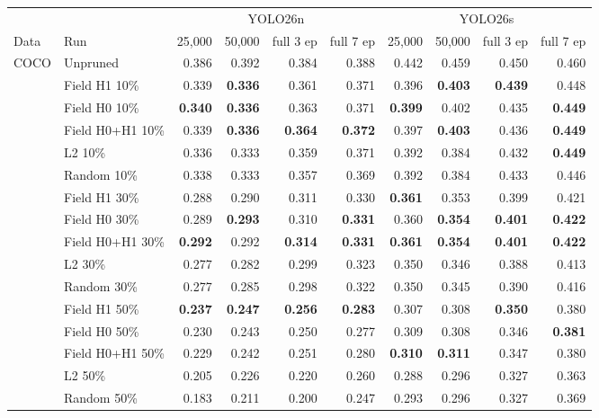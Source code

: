 \begin{tabular}{llrrrrrrrr}
\toprule
 & & \multicolumn{4}{c}{YOLO26n} & \multicolumn{4}{c}{YOLO26s} \\
\cmidrule(lr){3-6}\cmidrule(lr){7-10}
Data & Run & 25,000 & 50,000 & full 3 ep & full 7 ep & 25,000 & 50,000 & full 3 ep & full 7 ep \\
\midrule
COCO & Unpruned & 0.386 & 0.392 & 0.384 & 0.388 & 0.442 & 0.459 & 0.450 & 0.460 \\
 & Field H1 10\% & 0.339 & \textbf{0.336} & 0.361 & 0.371 & 0.396 & \textbf{0.403} & \textbf{0.439} & 0.448 \\
 & Field H0 10\% & \textbf{0.340} & \textbf{0.336} & 0.363 & 0.371 & \textbf{0.399} & 0.402 & 0.435 & \textbf{0.449} \\
 & Field H0+H1 10\% & 0.339 & \textbf{0.336} & \textbf{0.364} & \textbf{0.372} & 0.397 & \textbf{0.403} & 0.436 & \textbf{0.449} \\
 & L2 10\% & 0.336 & 0.333 & 0.359 & 0.371 & 0.392 & 0.384 & 0.432 & \textbf{0.449} \\
 & Random 10\% & 0.338 & 0.333 & 0.357 & 0.369 & 0.392 & 0.384 & 0.433 & 0.446 \\
\addlinespace[2pt]
 & Field H1 30\% & 0.288 & 0.290 & 0.311 & 0.330 & \textbf{0.361} & 0.353 & 0.399 & 0.421 \\
 & Field H0 30\% & 0.289 & \textbf{0.293} & 0.310 & \textbf{0.331} & 0.360 & \textbf{0.354} & \textbf{0.401} & \textbf{0.422} \\
 & Field H0+H1 30\% & \textbf{0.292} & 0.292 & \textbf{0.314} & \textbf{0.331} & \textbf{0.361} & \textbf{0.354} & \textbf{0.401} & \textbf{0.422} \\
 & L2 30\% & 0.277 & 0.282 & 0.299 & 0.323 & 0.350 & 0.346 & 0.388 & 0.413 \\
 & Random 30\% & 0.277 & 0.285 & 0.298 & 0.322 & 0.350 & 0.345 & 0.390 & 0.416 \\
\addlinespace[2pt]
 & Field H1 50\% & \textbf{0.237} & \textbf{0.247} & \textbf{0.256} & \textbf{0.283} & 0.307 & 0.308 & \textbf{0.350} & 0.380 \\
 & Field H0 50\% & 0.230 & 0.243 & 0.250 & 0.277 & 0.309 & 0.308 & 0.346 & \textbf{0.381} \\
 & Field H0+H1 50\% & 0.229 & 0.242 & 0.251 & 0.280 & \textbf{0.310} & \textbf{0.311} & 0.347 & 0.380 \\
 & L2 50\% & 0.205 & 0.226 & 0.220 & 0.260 & 0.288 & 0.296 & 0.327 & 0.363 \\
 & Random 50\% & 0.183 & 0.211 & 0.200 & 0.247 & 0.293 & 0.296 & 0.327 & 0.369 \\
\bottomrule
\end{tabular}
